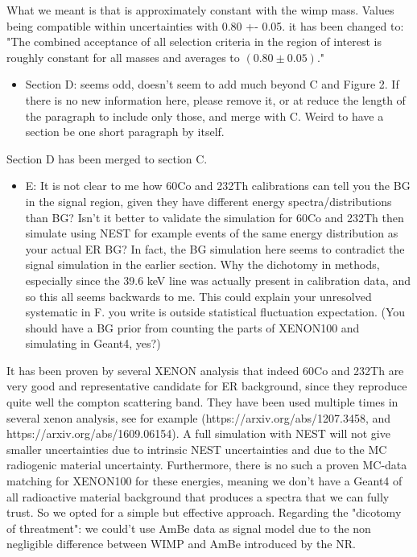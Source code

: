 \documentclass{article}
\begin{document}
What we meant is that is approximately constant with the wimp mass.
Values being compatible within uncertainties with 0.80 +- 0.05.
it has been changed to: "The combined acceptance  of all selection criteria in the region 
of interest is roughly constant for all masses and averages to $(0.80\pm0.05)$."



\begin{itemize}
	\item {\color{blue} 
Section D: seems odd, doesn’t seem to add much beyond C and Figure 2.
If there is no new information here, please remove it, or at reduce
the length of the paragraph to include only those, and merge with C.
Weird to have a section be one short paragraph by itself.}
\end{itemize}


Section D has been merged to section C.



\begin{itemize}
	\item {\color{blue} 
E: It is not clear to me how 60Co and 232Th calibrations can tell you
the BG in the signal region, given they have different energy
spectra/distributions than BG? Isn’t it better to validate the
simulation for 60Co and 232Th then simulate using NEST for example
events of the same energy distribution as your actual ER BG? In fact,
the BG simulation here seems to contradict the signal simulation in
the earlier section. Why the dichotomy in methods, especially since
the 39.6 keV line was actually present in calibration data, and so
this all seems backwards to me. This could explain your unresolved
systematic in F. you write is outside statistical fluctuation
expectation. (You should have a BG prior from counting the parts of
XENON100 and simulating in Geant4, yes?)}
\end{itemize}


It has been proven by several XENON analysis that indeed 60Co and 232Th are very good
and representative candidate for ER background, since they reproduce quite well the compton
scattering band. They have been used multiple times in several xenon analysis, see for 
example (https://arxiv.org/abs/1207.3458, and https://arxiv.org/abs/1609.06154).
A full simulation with NEST will not give smaller uncertainties due to intrinsic
NEST uncertainties and due to the MC radiogenic material uncertainty. 
Furthermore, there is no such a proven MC-data matching for XENON100 for these energies, 
meaning we don't have a Geant4 of all radioactive material 
background that produces a spectra that we can fully trust. So we opted for a simple 
but effective approach. 
Regarding the "dicotomy of threatment": we could't use AmBe data as signal model due to 
the non negligible difference between WIMP and AmBe introduced by the NR.
\end{document}
